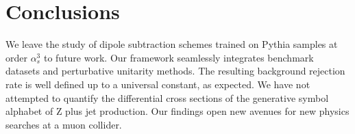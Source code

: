 \section{Conclusions}\label{sec:conclusions}

We leave the study of dipole subtraction schemes trained on Pythia
samples at order $\alpha_s^3$ to future work. Our framework seamlessly
integrates benchmark datasets and perturbative unitarity methods. The
resulting background rejection rate is well defined up to a universal
constant, as expected. We have not attempted to quantify the
differential cross sections of the generative symbol alphabet of Z plus
jet production. Our findings open new avenues for new physics searches
at a muon collider.

